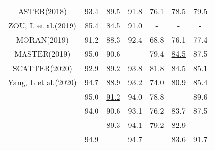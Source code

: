 \documentclass[runningheads]{llncs}
\begin{document}
\begin{table}[]
\begin{tabular}{|c|c|c|c|c|c|c|}
ASTER(2018)\cite{shi2018aster}                     & 93.4            & 89.5         & 91.8          & 76.1          & 78.5          & 79.5          \\
ZOU, L et al.(2019)\cite{zuo2019natural}        & 85.4            & 84.5         & 91.0          &  -          & -         &  -          \\
MORAN(2019)\cite{luo2019moran}                   & 91.2            & 88.3         & 92.4          &  68.8          & 76.1         &  77.4          \\
MASTER(2019)\cite{lu2019master}                   & 95.0            & 90.6         &          & 79.4          & \underline{84.5}          & 87.5          \\
SCATTER(2020)\cite{litman2020scatter}                & 92.9            & 89.2         & 93.8          & \underline{81.8}          & \underline{84.5}          & 85.1          \\
Yang, L et al.(2020)\cite{yang2020holistic}            & 94.7            & 88.9         & 93.2          & 74.0          & 80.9          & 85.4          \\ \hline
\cite{li2019show}      & 95.0            & \underline{91.2}         & 94.0          & 78.8          &           & 89.6          \\
    &94.0      &90.6      &93.1      &76.2     &83.7      &87.5     \\
\cite{yue2020robustscanner}         &             & 89.3         & 94.1          & 79.2          & 82.9          &           \\ \hline
                       & 94.9                &              & \underline{94.7}              &               &  83.6             &  \underline{91.7}             \\ \hline
\end{tabular}
\end{table}
\vspace{-0.5cm}
\end{document}
